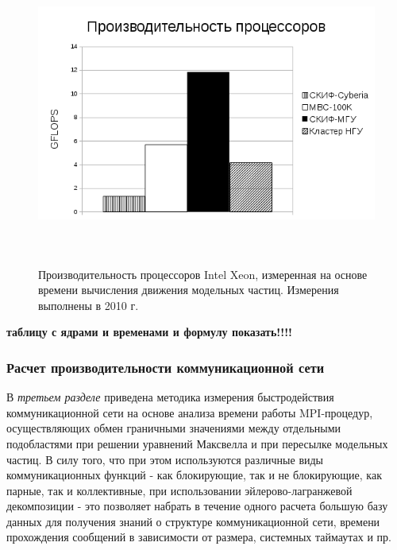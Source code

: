\begin{figure}[htb]
	\begin{center}
		\includegraphics[height=10cm,keepaspectratio]{images/processor_FLOPS_PIC.png}
	\end{center}
	\caption{Производительность процессоров Intel Xeon, измеренная на основе времени вычисления движения модельных частиц. Измерения выполнены в 2010 г.}
	\label{procs_flops_pic}
\end{figure} 

\textbf{таблицу с ядрами и временами и формулу показать!!!!}



\subsubsection{Расчет производительности коммуникационной сети}
\label{perfCommNet}
В \textit{третьем разделе} приведена методика измерения быстродействия коммуникационной сети на основе анализа времени работы MPI-процедур, осуществляющих обмен граничными значениями между отдельными подобластями при решении уравнений Максвелла и при пересылке модельных частиц. В силу того, что при этом используются различные виды коммуникационных функций  - как блокирующие, так и не блокирующие, как парные, так и коллективные, при использовании эйлерово-лагранжевой декомпозиции - это позволяет набрать в течение одного расчета большую базу данных для получения знаний о структуре коммуникационной сети, времени прохождения сообщений в зависимости от размера, системных таймаутах и пр. 

